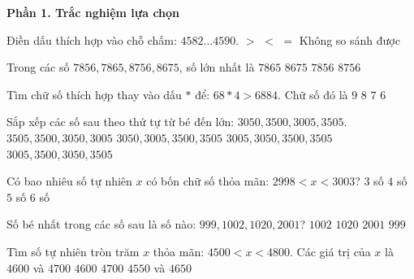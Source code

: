 \textbf{Phần 1. Trắc nghiệm lựa chọn}

\begin{ex} %
Điền dấu thích hợp vào chỗ chấm: $4582 \dots 4590$.
\choice
{$>$}
{\True $<$}
{$=$}
{Không so sánh được}
\end{ex}

\begin{ex} %
Trong các số $7856, 7865, 8756, 8675$, số lớn nhất là
\choice
{$7865$}
{$8675$}
{$7856$}
{\True $8756$}
\end{ex}

\begin{ex} %
Tìm chữ số thích hợp thay vào dấu $*$ để: $68*4 > 6884$. Chữ số đó là
\choice
{\True $9$}
{$8$}
{$7$}
{$6$}
\end{ex}

\begin{ex} %
Sắp xếp các số sau theo thứ tự từ bé đến lớn: $3050, 3500, 3005, 3505$.
\choice
{$3505, 3500, 3050, 3005$}
{$3050, 3005, 3500, 3505$}
{\True $3005, 3050, 3500, 3505$}
{$3005, 3500, 3050, 3505$}
\end{ex}

\begin{ex} %
Có bao nhiêu số tự nhiên $x$ có bốn chữ số thỏa mãn: $2998 < x < 3003$?
\choice
{$3$ số}
{\True $4$ số}
{$5$ số}
{$6$ số}
\end{ex}

\begin{ex} %
Số bé nhất trong các số sau là số nào: $999, 1002, 1020, 2001$?
\choice
{$1002$}
{$1020$}
{$2001$}
{\True $999$}
\end{ex}

\begin{ex} %
Tìm số tự nhiên tròn trăm $x$ thỏa mãn: $4500 < x < 4800$. Các giá trị của $x$ là
\choice
{\True $4600$ và $4700$}
{$4600$}
{$4700$}
{$4550$ và $4650$}
\end{ex}

